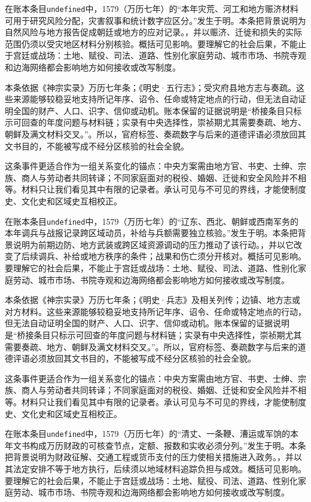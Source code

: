 在账本条目\texttt{undefined}中，1579（万历七年）的“本年灾荒、河工和地方赈济材料可用于研究风险分配，灾害叙事和统计数字应区分。”发生于明。本条把背景说明为自然风险与地方报告促成朝廷或地方的应对记录。，并以赈济、迁徙和损失的实际范围仍须以受灾地区材料分别核验。概括可见影响。要理解它的社会后果，不能止于宫廷或战场：土地、赋役、司法、道路、性别化家庭劳动、城市市场、书院寺观和边海网络都会影响地方如何接收或改写制度。

本条依据《神宗实录》万历七年条；《明史·五行志》；受灾府县地方志与奏疏。这些来源能够较稳妥地支持所记年序、诏令、任命或特定地点的行动，但无法自动证明全国的财产、人口、识字、信仰或动机。账本保留的证据说明是“桥接条目只标示可回查的年度问题与材料链；实录有中央选择性，崇祯期尤其需要奏疏、地方、朝鲜及满文材料交叉。”。所以，官府标签、奏疏数字与后来的道德评语必须放回其文书目的，不能被写成不经分区核验的社会全貌。

这条事件更适合作为一组关系变化的锚点：中央方案需由地方官、书吏、士绅、宗族、商人与劳动者共同转译；不同家庭面对的税役、婚姻、迁徙和安全风险并不相等。材料只让我们看见其中有限的记录者。承认可见与不可见的界线，才能使制度史、文化史和区域史互相校正。

在账本条目\texttt{undefined}中，1579（万历七年）的“辽东、西北、朝鲜或西南军务的本年调兵与战报记录跨区域动员，补给与兵额需要独立核验。”发生于明。本条把背景说明为前期边防、地方武装或跨区域资源调动的压力推动了该行动。，并以它改变了后续调兵、补给或地方秩序的条件；战果和伤亡须分开核对。概括可见影响。要理解它的社会后果，不能止于宫廷或战场：土地、赋役、司法、道路、性别化家庭劳动、城市市场、书院寺观和边海网络都会影响地方如何接收或改写制度。

本条依据《神宗实录》万历七年条；《明史·兵志》及相关列传；边镇、地方志或对方材料。这些来源能够较稳妥地支持所记年序、诏令、任命或特定地点的行动，但无法自动证明全国的财产、人口、识字、信仰或动机。账本保留的证据说明是“桥接条目只标示可回查的年度问题与材料链；实录有中央选择性，崇祯期尤其需要奏疏、地方、朝鲜及满文材料交叉。”。所以，官府标签、奏疏数字与后来的道德评语必须放回其文书目的，不能被写成不经分区核验的社会全貌。

这条事件更适合作为一组关系变化的锚点：中央方案需由地方官、书吏、士绅、宗族、商人与劳动者共同转译；不同家庭面对的税役、婚姻、迁徙和安全风险并不相等。材料只让我们看见其中有限的记录者。承认可见与不可见的界线，才能使制度史、文化史和区域史互相校正。

在账本条目\texttt{undefined}中，1579（万历七年）的“清丈、一条鞭、漕运或军饷的本年文书构成万历财政的可核查节点，定额、报数和实收必须分列。”发生于明。本条把背景说明为财政征解、交通工程或货币支付的压力使相关措施进入政务。，并以其法定安排不等于地方执行，后续须以地域材料追踪负担与成效。概括可见影响。要理解它的社会后果，不能止于宫廷或战场：土地、赋役、司法、道路、性别化家庭劳动、城市市场、书院寺观和边海网络都会影响地方如何接收或改写制度。

